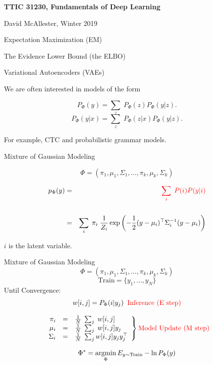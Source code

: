 





{\Huge

  \centerline{\bf TTIC 31230, Fundamentals of Deep Learning}
  \bigskip
  \centerline{David McAllester, Winter 2019}
  \vfill
  \centerline{Expectation Maximization (EM)}
  \vfill
  \centerline{The Evidence Lower Bound (the ELBO)}
  \vfill
  \centerline{Variational Autoencoders (VAEs)}
  \vfill
  \vfill


We are often interested in models of the form

\vfill
{\color{red} $$P_\Phi(y) = \sum_z\;P_\Phi(z)P_\Phi(y|z).$$}
{\color{red} $$P_\Phi(y|x) = \sum_z\;P_\Phi(z|x)P_\Phi(y|z).$$}

\vfill
For example, CTC and probabilistic grammar models.

{Mixture of Gaussian Modeling}

{\color{red} $$\Phi = (\pi_1,\mu_1,\Sigma_1,\ldots,\pi_k,\mu_k,\Sigma_k)$$}

\begin{eqnarray*}
p_\Phi(y) & = & {\color{red} \sum_i\;P(i)P(y|i)} \\
\\
& = & \sum_i\;\pi_i\;\frac{1}{Z_i}\exp\left(-\frac{1}{2}(y-\mu_i)^\top \Sigma_i^{-1}(y - \mu_i)\right)
\end{eqnarray*}

\vfill
{\color{red} $i$ is the latent variable.}

{Mixture of Gaussian Modeling}
\vspace{-4ex}
$$\Phi = (\pi_1,\mu_1,\Sigma_1,\ldots,\pi_k,\mu_k,\Sigma_k)$$
$$\mbox{Train} = \{y_1,\ldots,y_N\}$$
Until Convergence:
$$w[i,j] = P_\Phi(i|y_j) \;\;\mbox{\color{red} Inference (E step)}$$

$$\left.
\begin{array}{rcl}
  \pi_i & = & \frac{1}{N}\; \sum_j \;w[i,j] \\
  \mu_i & = & \frac{1}{N}\; \sum_j \;w[i,j]y_j \\
  \Sigma_i & = & \frac{1}{N}\; \sum_j w[i,j]y_jy_j^\top
\end{array}
  \right\} \mbox{\color{red} Model Update (M step)}$$

{\color{red} $$\Phi^* = \operatorname*{argmin}_\Phi E_{y \sim \mathrm{Train}} -\ln P_\Phi(y)$$}

}
